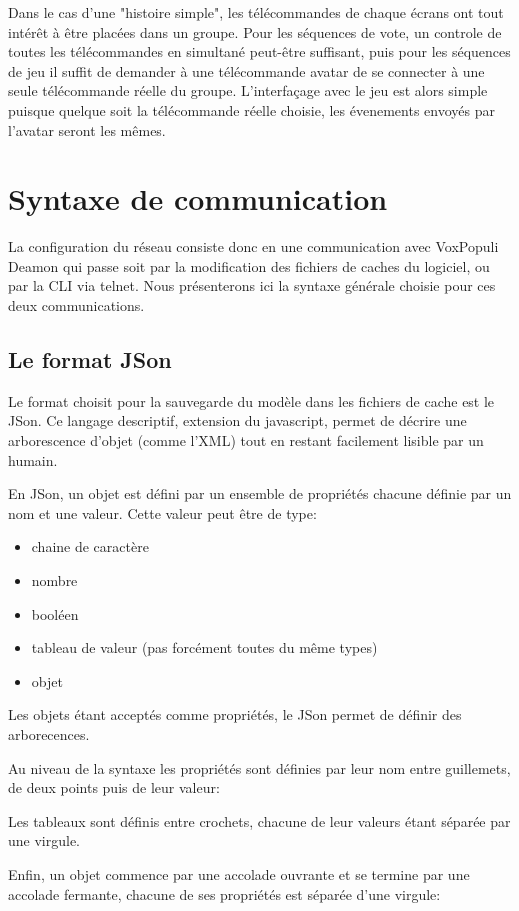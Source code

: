 \documentclass{Rapport}
\begin{document}
Dans le cas d'une "histoire simple", les télécommandes de chaque écrans ont tout intérêt à être placées dans un groupe. Pour les séquences de vote, un controle de toutes les télécommandes en simultané peut-être suffisant, puis pour les séquences de jeu il suffit de demander à une télécommande avatar de se connecter à une seule télécommande réelle du groupe. L'interfaçage avec le jeu est alors simple puisque quelque soit la télécommande réelle choisie, les évenements envoyés par l'avatar seront les mêmes.


\section{Syntaxe de communication}

La configuration du réseau consiste donc en une communication avec VoxPopuli Deamon qui passe soit par la modification des fichiers de caches du logiciel, ou par la CLI via telnet. Nous présenterons ici la syntaxe générale choisie pour ces deux communications.

\subsection*{Le format JSon}
Le format choisit pour la sauvegarde du modèle dans les fichiers de cache est le JSon. Ce langage descriptif, extension du javascript, permet de décrire une arborescence d'objet (comme l'XML) tout en restant facilement lisible par un humain.

En JSon, un objet est défini par un ensemble de propriétés chacune définie par un nom et une valeur. Cette valeur peut être de type:
\begin{itemize}
	\item chaine de caractère
	\item nombre
	\item booléen
	\item tableau de valeur (pas forcément toutes du même types)
	\item objet
\end{itemize}
Les objets étant acceptés comme propriétés, le JSon permet de définir des arborecences.

Au niveau de la syntaxe les propriétés sont définies par leur nom entre guillemets, de deux points puis de leur valeur:

Les tableaux sont définis entre crochets, chacune de leur valeurs étant séparée par une virgule.

Enfin, un objet commence par une accolade ouvrante et se termine par une accolade fermante, chacune de ses propriétés est séparée d'une virgule:
\end{document}
